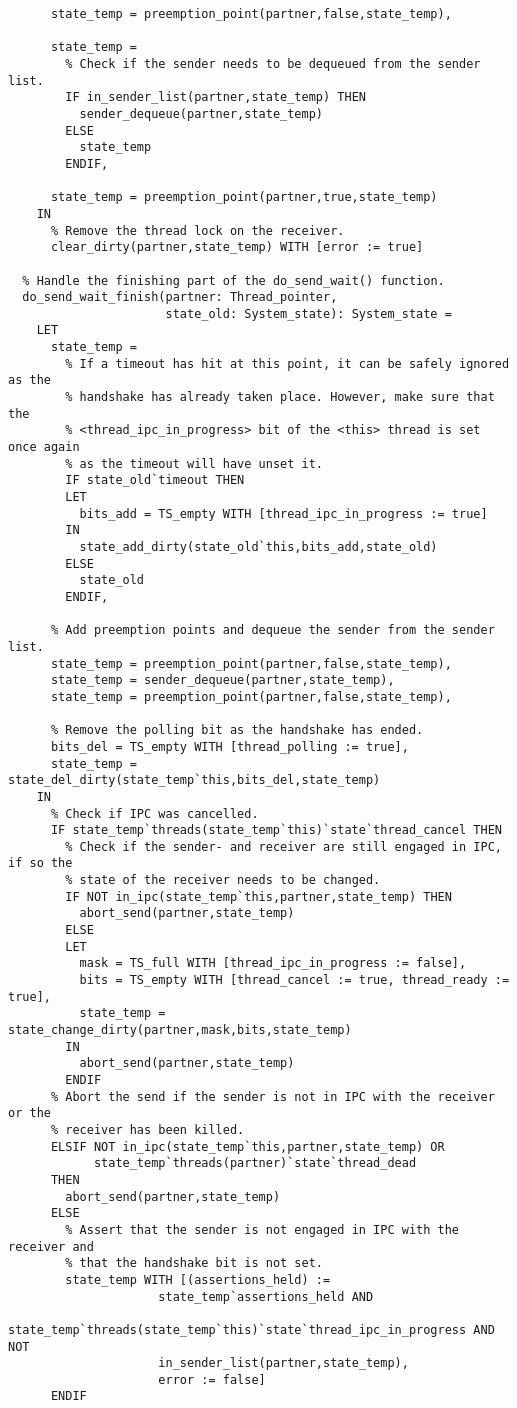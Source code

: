 \begin{lstlisting}
      state_temp = preemption_point(partner,false,state_temp),

      state_temp =	
        % Check if the sender needs to be dequeued from the sender list.
        IF in_sender_list(partner,state_temp) THEN
          sender_dequeue(partner,state_temp)
        ELSE
          state_temp
        ENDIF,

      state_temp = preemption_point(partner,true,state_temp)    
    IN
      % Remove the thread lock on the receiver.
      clear_dirty(partner,state_temp) WITH [error := true]

  % Handle the finishing part of the do_send_wait() function.
  do_send_wait_finish(partner: Thread_pointer,
                      state_old: System_state): System_state =
    LET
      state_temp = 
        % If a timeout has hit at this point, it can be safely ignored as the
        % handshake has already taken place. However, make sure that the
        % <thread_ipc_in_progress> bit of the <this> thread is set once again 
        % as the timeout will have unset it.
        IF state_old`timeout THEN
        LET
          bits_add = TS_empty WITH [thread_ipc_in_progress := true]
        IN
          state_add_dirty(state_old`this,bits_add,state_old)
        ELSE
          state_old
        ENDIF,
    
      % Add preemption points and dequeue the sender from the sender list.
      state_temp = preemption_point(partner,false,state_temp),
      state_temp = sender_dequeue(partner,state_temp),
      state_temp = preemption_point(partner,false,state_temp),

      % Remove the polling bit as the handshake has ended.
      bits_del = TS_empty WITH [thread_polling := true],
      state_temp = state_del_dirty(state_temp`this,bits_del,state_temp)
    IN
      % Check if IPC was cancelled.
      IF state_temp`threads(state_temp`this)`state`thread_cancel THEN
        % Check if the sender- and receiver are still engaged in IPC, if so the
        % state of the receiver needs to be changed.
        IF NOT in_ipc(state_temp`this,partner,state_temp) THEN
          abort_send(partner,state_temp)
        ELSE
        LET 
          mask = TS_full WITH [thread_ipc_in_progress := false],
          bits = TS_empty WITH [thread_cancel := true, thread_ready := true],
          state_temp = state_change_dirty(partner,mask,bits,state_temp)
        IN  
          abort_send(partner,state_temp)   
        ENDIF
      % Abort the send if the sender is not in IPC with the receiver or the
      % receiver has been killed.
      ELSIF NOT in_ipc(state_temp`this,partner,state_temp) OR 
            state_temp`threads(partner)`state`thread_dead 
      THEN
        abort_send(partner,state_temp)
      ELSE
        % Assert that the sender is not engaged in IPC with the receiver and
        % that the handshake bit is not set.
        state_temp WITH [(assertions_held) := 
                     state_temp`assertions_held AND
        state_temp`threads(state_temp`this)`state`thread_ipc_in_progress AND NOT
                     in_sender_list(partner,state_temp),
                     error := false] 
      ENDIF
 

\end{lstlisting}
